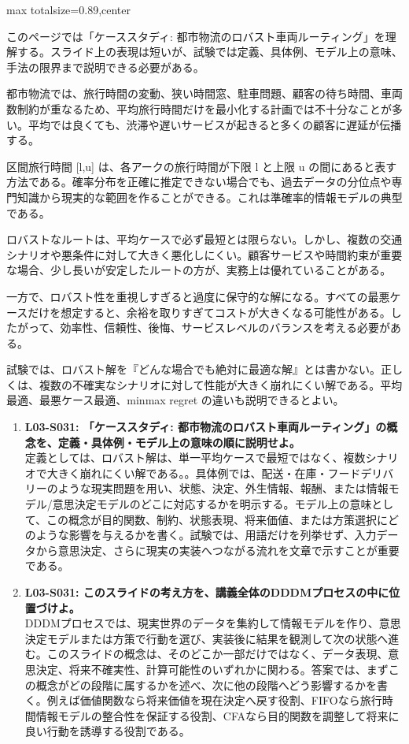 \begin{minipage}[t]{0.58\textwidth}
\begin{adjustbox}{max totalsize={\textwidth}{0.89\textheight},center}
\begin{minipage}{\textwidth}\scriptsize
{}このページでは「ケーススタディ: 都市物流のロバスト車両ルーティング」を理解する。スライド上の表現は短いが、試験では定義、具体例、モデル上の意味、手法の限界まで説明できる必要がある。\par
都市物流では、旅行時間の変動、狭い時間窓、駐車問題、顧客の待ち時間、車両数制約が重なるため、平均旅行時間だけを最小化する計画では不十分なことが多い。平均では良くても、渋滞や遅いサービスが起きると多くの顧客に遅延が伝播する。\par
区間旅行時間 [l,u] は、各アークの旅行時間が下限 l と上限 u の間にあると表す方法である。確率分布を正確に推定できない場合でも、過去データの分位点や専門知識から現実的な範囲を作ることができる。これは準確率的情報モデルの典型である。\par
ロバストなルートは、平均ケースで必ず最短とは限らない。しかし、複数の交通シナリオや悪条件に対して大きく悪化しにくい。顧客サービスや時間約束が重要な場合、少し長いが安定したルートの方が、実務上は優れていることがある。\par
一方で、ロバスト性を重視しすぎると過度に保守的な解になる。すべての最悪ケースだけを想定すると、余裕を取りすぎてコストが大きくなる可能性がある。したがって、効率性、信頼性、後悔、サービスレベルのバランスを考える必要がある。\par
試験では、ロバスト解を『どんな場合でも絶対に最適な解』とは書かない。正しくは、複数の不確実なシナリオに対して性能が大きく崩れにくい解である。平均最適、最悪ケース最適、minmax regret の違いも説明できるとよい。\par{}\begin{enumerate}\item \textbf{L03-S031: 「ケーススタディ: 都市物流のロバスト車両ルーティング」の概念を、定義・具体例・モデル上の意味の順に説明せよ。}\\定義としては、ロバスト解は、単一平均ケースで最短ではなく、複数シナリオで大きく崩れにくい解である。。具体例では、配送・在庫・フードデリバリーのような現実問題を用い、状態、決定、外生情報、報酬、または情報モデル/意思決定モデルのどこに対応するかを明示する。モデル上の意味として、この概念が目的関数、制約、状態表現、将来価値、または方策選択にどのような影響を与えるかを書く。試験では、用語だけを列挙せず、入力データから意思決定、さらに現実の実装へつながる流れを文章で示すことが重要である。\item \textbf{L03-S031: このスライドの考え方を、講義全体のDDDMプロセスの中に位置づけよ。}\\DDDMプロセスでは、現実世界のデータを集約して情報モデルを作り、意思決定モデルまたは方策で行動を選び、実装後に結果を観測して次の状態へ進む。このスライドの概念は、そのどこか一部だけではなく、データ表現、意思決定、将来不確実性、計算可能性のいずれかに関わる。答案では、まずこの概念がどの段階に属するかを述べ、次に他の段階へどう影響するかを書く。例えば価値関数なら将来価値を現在決定へ戻す役割、FIFOなら旅行時間情報モデルの整合性を保証する役割、CFAなら目的関数を調整して将来に良い行動を誘導する役割である。\end{enumerate}

\end{minipage}
\end{adjustbox}
\end{minipage}
